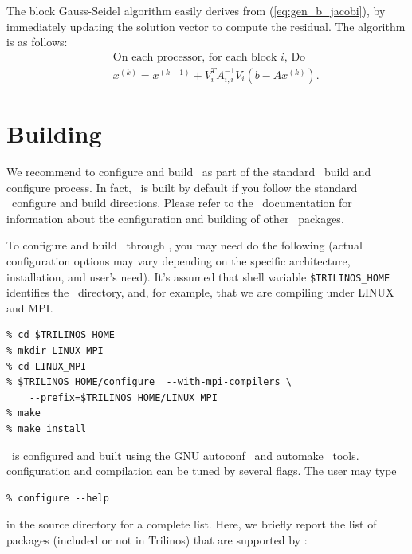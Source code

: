 The block Gauss-Seidel algorithm easily derives from
(\ref{eq:gen_b_jacobi}), by immediately updating the solution vector to
compute the residual. The algorithm is as follows:
\begin{eqnarray}
&& \mbox{On each processor, for each block $i$, Do} \\
&& \label{eq:gen_b_gs}
x^{(k)} = x^{(k-1)} + V_i^T A_{i,i}^{-1} V_i(b - A x^{(k)}).
\end{eqnarray}

\section{Building \ifpack}
\label{sec:config}

We recommend to configure and build \ifpack\ as part of the standard 
\trilinos~build and configure process.  In fact,
\ifpack\ is built by default if you follow the standard \trilinos~configure
and build directions. Please refer to the \trilinos~documentation 
for information about the configuration and building of
other \trilinos~packages.

\smallskip

To configure and build \ifpack\ through \trilinos, you may need do the
following (actual configuration options may vary depending on the
specific architecture, installation, and user's need).  It's assumed
that shell variable \verb!$TRILINOS_HOME!  identifies the
\trilinos~directory, and, for example, that we are compiling under LINUX
and MPI.
\begin{verbatim}
% cd $TRILINOS_HOME
% mkdir LINUX_MPI
% cd LINUX_MPI
% $TRILINOS_HOME/configure  --with-mpi-compilers \
    --prefix=$TRILINOS_HOME/LINUX_MPI
% make
% make install
\end{verbatim}

\ifpack\ is configured and built using the GNU autoconf~\cite{Autoconf} and
automake~\cite{Automake} tools. 
\ifpack configuration and compilation can be tuned by several flags.
The user may type 
\begin{verbatim}
% configure --help
\end{verbatim}
in the \ifpack source directory for a complete list. Here, we briefly report
the list of packages (included or not in Trilinos) that are supported 
by \ifpack:

